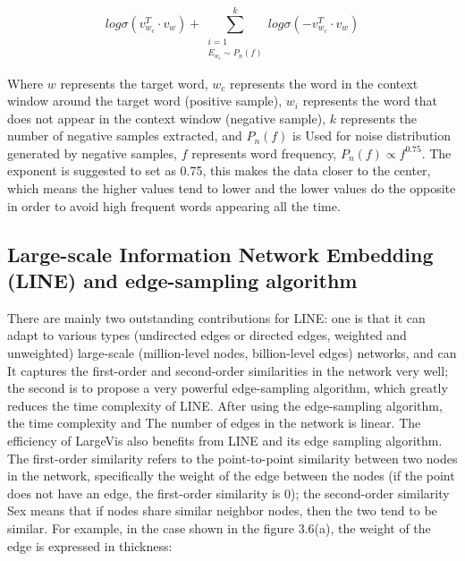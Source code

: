 \begin{equation*}
    {log \sigma(v_{w_c}^T \cdot v_w)} + {\sum^k_{\substack{i=1\\ {E_{w_i} \sim P_n(f)}}}log \sigma(-v_{w_c}^T \cdot v_w)}
\end{equation*}

\noindent Where $w$ represents the target word, $w_c$ represents the word in the context window around the target word (positive sample), $w_i$ represents the word that does not appear in the context window (negative sample), $k$ represents the number of negative samples extracted, and $P_n(f)$ is Used for noise distribution generated by negative samples, $f$ represents word frequency, $P_n(f)∝f^{0.75}$. The exponent is suggested to set as 0.75\cite{ref7}, this makes the data closer to the center, which means the higher values tend to lower and the lower values do the opposite in order to avoid high frequent words appearing all the time. 


\subsection{Large-scale Information Network Embedding (LINE) and edge-sampling algorithm}

\noindent There are mainly two outstanding contributions for LINE: one is that it can adapt to various types (undirected edges or directed edges, weighted and unweighted) large-scale (million-level nodes, billion-level edges) networks, and can It captures the first-order and second-order similarities in the network very well; the second is to propose a very powerful edge-sampling algorithm, which greatly reduces the time complexity of LINE. After using the edge-sampling algorithm, the time complexity and The number of edges in the network is linear. The efficiency of LargeVis also benefits from LINE and its edge sampling algorithm.\\

\noindent The first-order similarity refers to the point-to-point similarity between two nodes in the network, specifically the weight of the edge between the nodes (if the point does not have an edge, the first-order similarity is 0); the second-order similarity Sex means that if nodes share similar neighbor nodes, then the two tend to be similar. For example, in the case shown in the figure 3.6(a), the weight of the edge is expressed in thickness:


